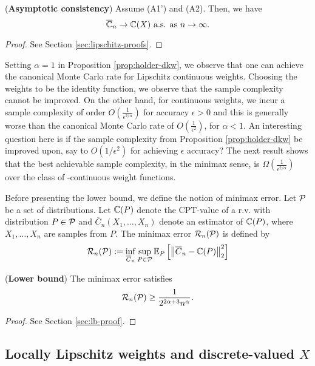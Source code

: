\begin{proposition}(\textbf{Asymptotic consistency})
\label{prop:lipschitz}
Assume (A1') and (A2). Then, we have 
$$\overline {\mathbb{C}}_n
\rightarrow
\mathbb{C}(X)
 \text{   a.s. as } n\rightarrow \infty.
$$
\end{proposition}
\begin{proof}
See Section \ref{sec:lipschitz-proofs}.
\end{proof}

Setting $\alpha=1$ in Proposition \ref{prop:holder-dkw}, we observe that one can achieve the canonical Monte Carlo rate for Lipschitz continuous weights. Choosing the weights to be the identity function, we observe that the sample complexity cannot be improved.
 On the other hand, for \holder continuous weights, we incur a sample complexity of order $O\left(\frac1{\epsilon^{2/\alpha}}\right)$ for accuracy $\epsilon>0$ and this is generally worse than the canonical Monte Carlo rate of $O\left(\frac1{\epsilon^2}\right)$, for $\alpha < 1$. 
An interesting question here is if the sample complexity from Proposition \ref{prop:holder-dkw} be improved upon, say to $O(1/\epsilon^2)$ for achieving $\epsilon$ accuracy? The next result shows that the best achievable sample complexity, in the minimax sense, is $\Omega\left(\frac{1}{\epsilon^{2/\alpha}}\right)$ over the class of \holderNS-continuous weight functions. 

Before presenting the lower bound, we define the notion of minimax error. 
Let $\mathcal{P}$ be a set of distributions. Let $\mathbb{C}(P)$ denote the CPT-value of a r.v. with distribution $P \in \mathcal{P}$ and $\overline C_n(X_1,\ldots,X_n)$ denote an estimator of $\mathbb{C}(P)$, where $X_1,\ldots,X_n$ are samples from $P$. The minimax error $\mathcal{R}_n(\mathcal{P})$ is defined by
\begin{align}
 \mathcal{R}_n(\mathcal{P}) := \inf_{\overline C_n} \sup_{P \in \mathcal{P}} \mathbb{E}_P\left[ \left\| \overline C_n - \mathbb{C}(P) \right\|^2_2 \right]
\end{align}


\begin{proposition}(\textbf{Lower bound})
	\label{prop:lower-bound}
 The minimax error satisfies $$ \mathcal{R}_n(\mathcal{P}) \ge \frac1{2^{2\alpha+3} n^\alpha}.$$
\end{proposition}
\begin{proof}
	See Section \ref{sec:lb-proof}.
\end{proof}


\subsection{Locally Lipschitz weights and discrete-valued $X$}

